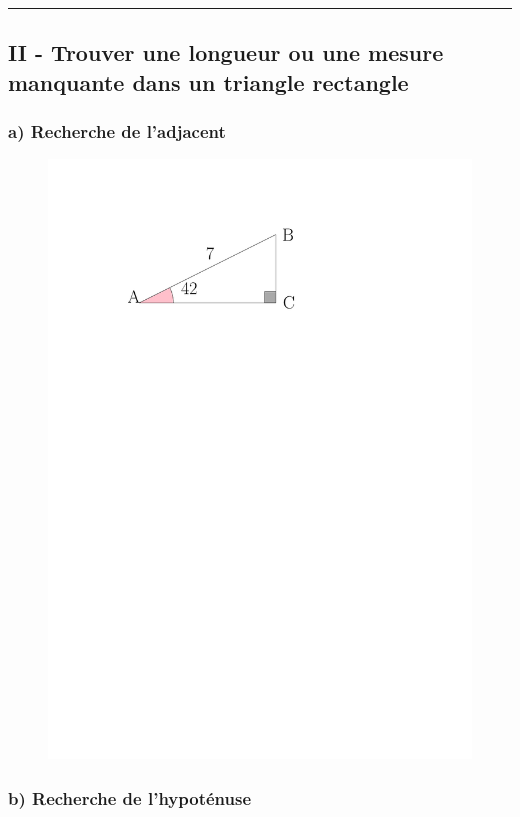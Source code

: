 \documentclass[paper=a4, fontsize=11pt]{scrartcl} %
\newcommand{\horrule}[1]{\rule{\linewidth}{#1}} %
\begin{document}
 \horrule{0.5pt}
\subsection*{II - Trouver une longueur ou une mesure manquante dans un triangle rectangle}

\begin{multicols}{3}
  
  \subsubsection*{a) Recherche de l'adjacent}
  \begin{figure}[H]
	  \centering
	  \includegraphics[width=0.8\linewidth]{sources/2/rec-a1.pdf}
	\end{figure}

  \subsubsection*{b) Recherche de l'hypoténuse}
  

\end{multicols}
\end{document}
